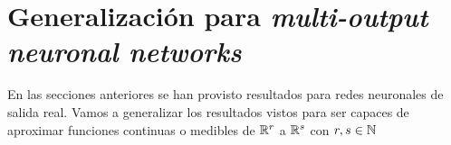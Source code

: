 %
\section{Generalización para \textit{multi-output neuronal networks}}

En las secciones anteriores se han provisto resultados para redes 
neuronales de salida real. Vamos a generalizar los resultados vistos
para ser capaces de aproximar funciones continuas o medibles 
de $\mathbb{R}^r$ a $\mathbb{R}^s$ con $r,s \in \mathbb{N}$
